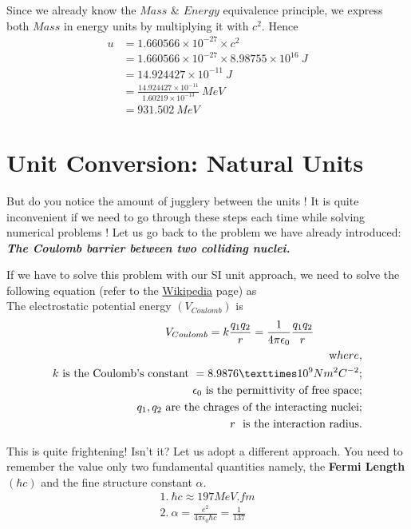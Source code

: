     \par Since we already know the $Mass$ \& $Energy$ equivalence principle, we express both $Mass$ in energy units by multiplying it with $c^{2}$. Hence
    \begin{equation}
         \begin{split}
    u &= 1.660566×10^{-27} × c^{2} \\[5pt]
    &= 1.660566×10^{-27} × 8.98755×10^{16} \ J \\[5pt]
    &= 14.924427×10^{-11} \ J \\[5pt]
    &= \frac{14.924427×10^{-11}}{1.60219×10^{-13}} \ MeV \\[5pt]
    &= 931.502 \ MeV 
         \end{split}
    \end{equation}
    \section{{Unit Conversion: Natural Units}}
    But do you notice the amount of jugglery between the units ! It is quite inconvenient if we need to go through these steps each time while solving numerical problems ! Let us go back to the problem we have already introduced: \textbf{\textit{The Coulomb barrier between two colliding nuclei.}}
    \par If we have to solve this problem with our SI unit approach, we need to solve the following equation (refer to the \href{https://en.wikipedia.org/wiki/Coulomb_barrier}{Wikipedia} page) as\\
    The electrostatic potential energy $(V_{Coulomb})$ is
    \begin{equation}
        \begin{split}
    V_{Coulomb} = k \frac{q_1q_2}{r} = \frac{1}{4 \pi \epsilon_0} \frac{q_1q_2}{r}~~~~~~~~~~~~~\\
            \textrm where,\\
            k~\textrm {is the Coulomb's constant}~= 8.9876×10^{9}Nm^{2}C^{-2};\\
            \epsilon_0~\textrm {is the permittivity of free space;}\\
            q_1,q_2~\textrm{are the chrages of the interacting nuclei;}\\
            r~\textrm{ is the interaction radius.}
        \end{split}
    \end{equation}
    
    This is quite frightening! Isn't it? Let us adopt a different approach. You need to remember the value only two fundamental quantities namely, the \textbf{Fermi Length} $(\hbar c)$ and the fine structure constant $\alpha$. \\
    \begin{equation}
         \begin{split}
          1. \ \hbar c \approx 197MeV.fm \\[12pt]
          2. \ \alpha = \frac{e^{2}}{4 \pi \epsilon_0 \hbar c } = \frac{1}{137}\\[12pt]
          \end{split}
    \end{equation} 
          
